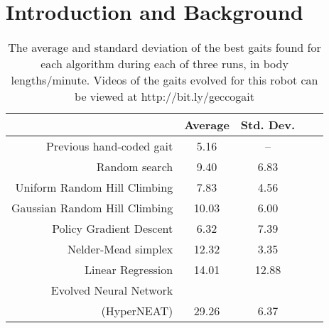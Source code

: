 \section{Introduction and Background}


\begin{table}
\begin{center}
\begin{tabular}{|r|c|c|c||c|}
\hline
                                         & Average & Std. Dev. \\
\hline                                    
\hline                                    
Previous hand-coded gait                 & 5.16   &   --     \\
\hline
Random search                            & 9.40   &   6.83   \\
\hline
Uniform Random Hill Climbing             & 7.83   &   4.56   \\
\hline
Gaussian Random Hill Climbing            & 10.03  &   6.00   \\
\hline
Policy Gradient Descent                  & 6.32   &   7.39   \\
\hline
Nelder-Mead simplex                      & 12.32  &   3.35   \\
\hline
Linear Regression                        & 14.01  &  12.88   \\
\hline
Evolved Neural Network              &        &          \\
(HyperNEAT)                              & 29.26  &   6.37   \\
\hline
\end{tabular}
\caption{The average and standard deviation of the best gaits found
  for each algorithm during each of three runs, in body
  lengths/minute.  Videos of the gaits evolved for this robot can be
  viewed at http://bit.ly/geccogait} 
\end{center}
\end{table}




